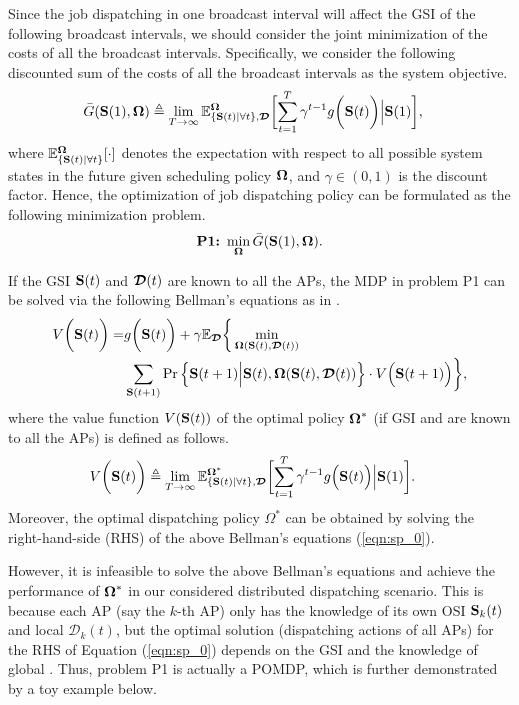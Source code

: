 Since the job dispatching in one broadcast interval will affect the GSI of the following broadcast intervals, we should consider the joint minimization of the costs of all the broadcast intervals.
Specifically, we consider the following discounted sum of the costs of all the broadcast intervals as the system objective.
\begin{align}
    &\bar{G}(\Stat(1), \Policy) \define
    \lim_{T \to \infty} \mathbb{E}^{\Policy}_{\set{\Stat(t)|\forall t}, \Delay}
    \Bracket{
        \sum_{t=1}^{T} \gamma^{t-1} g\Paren{\Stat(t)} \Big| \Stat(1)
    },
\end{align}
where $\mathbb{E}^{\boldsymbol{\Omega}}_{\{\mathbf{S}(t)|\forall t\}}[\cdot]$ denotes the expectation with respect to all possible system states in the future given scheduling policy $\boldsymbol{\Omega}$, and $\gamma \in (0,1)$ is the discount factor.
Hence, the optimization of job dispatching policy can be formulated as the following minimization problem.
\begin{align}
    \textbf{P1:}~
    \min_{\boldsymbol{\Omega}} \bar{G}(\mathbf{S}(1), \boldsymbol{\Omega}).
\end{align}

If the GSI $\mathbf{S}(t)$ and {\brlatency} $\boldsymbol{\mathcal{D}}(t)$ are known to all the APs, the MDP in problem P1 can be solved via the following Bellman's equations as in \cite{sutton1998}.
\begin{align}
    V\bigg(\mathbf{S}(t)\bigg) =&g\bigg(\mathbf{S}(t)\bigg)
        + \gamma\mathbb{E}_{\boldsymbol{\mathcal{D}}}\bigg\{
            \min_{\boldsymbol{\Omega}(\mathbf{S}(t),\boldsymbol{\mathcal{D}}(t))}
            \nonumber\\
            &\sum_{\mathbf{S}(t+1)} \Pr \Big\{ 
                \mathbf{S}(t+1) \Big| \mathbf{S}(t), \boldsymbol{\Omega}(\mathbf{S}(t), \boldsymbol{\mathcal{D}}(t)) \Big\} \cdot V\Big(\mathbf{S}(t+1)\Big)
            \bigg\},
    \label{eqn:sp_0}
\end{align}
where the value function $V(\mathbf{S}(t))$ of the optimal policy $\boldsymbol{\Omega}^{*}$ (if GSI and {\brlatency} are known to all the APs) is defined as follows.
\begin{align}
    &V\Paren{\Stat(t)} \define
    \lim_{T\to\infty} 
    \mathbb{E}^{\Policy^*}_{\set{\Stat(t)|\forall t}, \Delay} \Bracket{
        \sum_{t=1}^{T} \gamma^{t-1} g\Big( \Stat(t) \Big) \Big| \Stat(1)
    }.
    \label{eqn:val_f}
\end{align}
Moreover, the optimal dispatching policy $\Omega^{*}$ can be obtained by solving the right-hand-side (RHS) of the above Bellman's equations (\ref{eqn:sp_0}).

However, it is infeasible to solve the above Bellman's equations {and achieve the performance of $\boldsymbol{\Omega}^*$ in our considered distributed dispatching scenario.}
This is because each AP (say the $k$-th AP) only has the knowledge of its own OSI $\mathbf{S}_{k}(t)$ and local {\brlatency} $\mathcal{D}_{k}(t)$, but the optimal solution (dispatching actions of all APs) for the RHS of Equation (\ref{eqn:sp_0}) depends on the GSI and the knowledge of global {\brlatency}.
Thus, problem P1 is actually a POMDP, which is further demonstrated by a toy example below.

